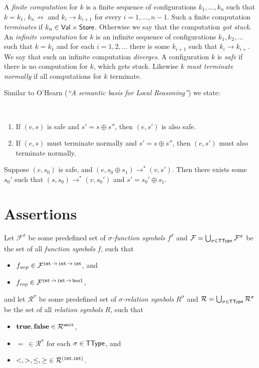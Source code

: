 \documentclass[12pt,a4paper]{article}
\newcommand{\aop}{\nstyle{aop}}
\newcommand{\rop}{\nstyle{rop}}
\begin{document}
A {\em finite computation} for $k$ is a finite sequence of configurations $k_1,\ldots,k_n$
such that $k = k_1$, $k_n \not\to$ and $k_i \to k_{i+1}$ for every $i=1,\ldots,n-1$. Such a
finite computation {\em terminates} if $k_n \in \mathsf{Val}\times\mathsf{Store}$. Otherwise
we say that the computation {\em got stuck}.
An {\em infinite computation} for $k$ is an infinite sequence of configurations $k_1,k_2,\ldots$
such that $k=k_1$ and for each $i=1,2,\ldots$ there is some $k_{i+1}$ such that $k_i \to k_{i+}$.
We say that such an infinite computation {\em diverges}.
A configuration $k$ is {\em safe} if there is no computation for $k$, which gets
stuck. Likewise $k$ {\em must terminate normally} if all computations for $k$
terminate.

Similar to O'Hearn ({\em ``A semantic basis for Local Reasoning''}) we state:

\begin{lemma} \
  \begin{enumerate}
  \item If $(e,s)$ is safe and $s' = s \oplus s''$, then $(e,s')$ is also safe.
  \item If $(e,s)$ must terminate normally and $s' = s \oplus s''$, then $(e,s')$ must also terminate normally.
  \end{enumerate}
\end{lemma}

\begin{lemma}
  Suppose $(e,s_0)$ is safe, and $(e,s_0 \oplus s_1) \to^* (v,s')$. Then there exists some $s_0'$ such that
  $(s,s_0) \to^* (v,s_0')$ and $s' = s_0' \oplus s_1$.
\end{lemma}


\section{Assertions}

Let $\mathcal{F}^\sigma$ be some predefined set of {\em $\sigma$-function symbols} $f^\sigma$ and
$\mathcal{F} = \bigcup_{\sigma\in\mathsf{TType}}\mathcal{F}^\sigma$ be the set of all {\em function symbols} $f$, such that
\begin{itemize}
\item $f_\aop \in \mathcal{F}^{\ttarrow{\tint}{\ttarrow{\tint}{\tint}}}$, and
\item $f_\rop \in \mathcal{F}^{\ttarrow{\tint}{\ttarrow{\tint}{\tbool}}}$,
\end{itemize}
and let $\mathcal{R}^\sigma$ be some predefined set of {\em $\sigma$-relation symbols} $R^\sigma$ and
$\mathcal{R} = \bigcup_{\sigma\in\mathsf{TType}}\mathcal{R}^\sigma$ be the set of all {\em relation symbols} $R$, such that
\begin{itemize}
\item $\mathbf{true},\mathbf{false}\in \mathcal{R}^{\mathtt{unit}}$,
\item $=\ \in \mathcal{R}^\sigma$ for each $\sigma\in\mathsf{TType}$, and
\item $<,>,\le,\ge\ \in \mathcal{R}^{(\mathtt{int},\mathtt{int})}$.
\end{itemize}
\end{document}
